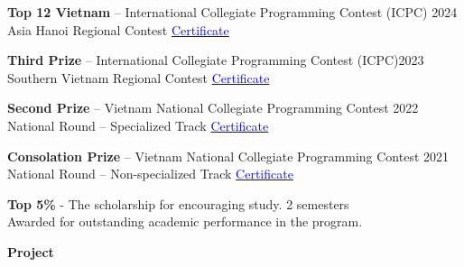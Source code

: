 \documentclass[11pt]{article}
\begin{document}
    \vspace{0.5em}

    \textbf{Top 12 Vietnam} – International Collegiate Programming Contest (ICPC) \hfill 2024 \\
    Asia Hanoi Regional Contest  
    \hfill \href{https://github.com/taitruong256/Competitive-programming/blob/main/DH-Cong-nghiep-Thanh-pho-Ho-Chi-Minh-certificates-Top12-Viet-Nam.pdf}{\textcolor{blue}{Certificate}}

    \vspace{0.5em}
    
    \textbf{Third Prize} – International Collegiate Programming Contest (ICPC)\hfill 2023 \\
    Southern Vietnam Regional Contest  
    \hfill 
    \href{https://github.com/taitruong256/Competitive-programming/blob/main/2024-ICPC-Vietnam-Southern-Provincial-PC-MEDAL.pdf}{\textcolor{blue}{Certificate}}
    
    \vspace{0.5em}
    
    \textbf{Second Prize} – Vietnam National Collegiate Programming Contest  \hfill 2022 \\
    National Round – Specialized Track  
    \hfill 
    \href{https://github.com/taitruong256/Competitive-programming/blob/main/Bang-khen-giai-Nhi-Olympic-Tin-hoc-Sinh-vien-Viet-Nam-2022-khoi-Chuyen-tin.jpg}{\textcolor{blue}{Certificate}}
    
    \vspace{0.5em}
    
    \textbf{Consolation Prize} – Vietnam National Collegiate Programming Contest \hfill 2021 \\
    National Round – Non-specialized Track  
    \hfill 
    \href{https://github.com/taitruong256/Competitive-programming/blob/main/Chung-nhan-giai-Khuyen-khich-Olympic-Tin-hoc-Sinh-vien-Viet-Nam-2021-khoi-Khong-chuyen-tin.jpg}{\textcolor{blue}{Certificate}}
    
    \vspace{0.5em}
    
    \textbf{Top 5\%} - The scholarship for encouraging study. 
    \hfill 2 semesters \\
    Awarded for outstanding academic performance in the program.
    
        
    





    
    \begin{center}
        \hrulefill
    \end{center}
    \begin{center}
        \textbf{Project}
    \end{center}
\end{document}

